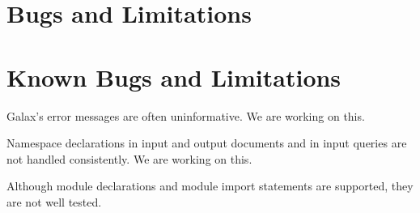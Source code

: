 \section{Bugs and Limitations}
\label{sec:bugs}
\section{Known Bugs and Limitations}

Galax's error messages are often uninformative.  We are working on
this.

Namespace declarations in input and output documents and in input
queries are not handled consistently.  We are working on this.

Although module declarations and module import statements are
supported, they are not well tested.

\begin{alltt}

\end{alltt}

